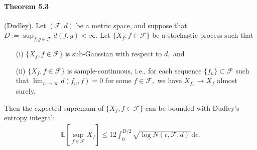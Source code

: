 \documentclass{article}
\newcommand{\E}{\mathbb{E}}
\begin{document}
\paragraph{Theorem 5.3} (Dudley). Let $(\mathcal{F},d)$ be a metric space, and suppose that $D := \sup_{f,g\in\mathcal{F}}d(f,g) < \infty$. Let $\{X_f:f\in\mathcal{F}\}$ be a stochastic process such that
\begin{itemize}
	\item[(i)] $\{X_f,f\in\mathcal{F}\}$ is sub-Gaussian with respect to $d,$ and
	\item[(ii)] $\{X_f,f\in\mathcal{F}\}$ is sample-continuous, i.e., for each sequence $\{f_n\}\subset\mathcal{F}$ such that $\lim_{n\to\infty}d(f_n,f) = 0$ for some $f\in\mathcal{F},$ we have $X_{f_n}\to X_f$ almost surely.
\end{itemize}   
Then the expected supremum of $\{X_f,f\in\mathcal{F}\}$ can be bounded with Dudley's entropy integral:
\begin{align*}
	\E\left[\sup_{f\in\mathcal{F}}X_f\right]\leq 12\int_0^{D/2}\sqrt{\log N(\epsilon,\mathcal{F},d)}\,\mathrm{d}\epsilon.\tag{5.3}
\end{align*}
\end{document}
